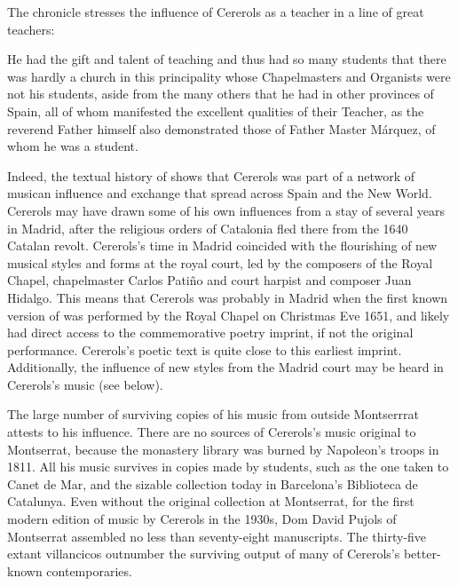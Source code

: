 The chronicle stresses the influence of Cererols as a teacher in a line of great
teachers:
\begin{quoting}
    He had the gift and talent of teaching and thus had so many students that
    there was hardly a church in this principality  whose
    Chapelmasters and Organists were not his students, aside from the many
    others that he had in other provinces of Spain, all of whom manifested the
    excellent qualities of their Teacher, as the reverend Father himself also
    demonstrated those of Father Master Márquez, of whom he  was a
    student.%
    \Autocite[7, note 2]{Estrada:CererolsBio}
\end{quoting}
Indeed, the textual history of  shows that Cererols
was part of a network of musican influence and exchange that spread across Spain
and the New World. 
Cererols may have drawn some of his own influences from a stay of several years
in Madrid, after the religious orders of Catalonia fled there from the 1640
Catalan revolt.
Cererols's time in Madrid coincided with the flourishing of new musical styles
and forms at the royal court, led by the composers of the Royal Chapel,
chapelmaster Carlos Patiño and court harpist and composer Juan Hidalgo.%
    \Autocites
    {Stein:Songs}
    {Rodriguez:Villancico}
This means that Cererols was probably in Madrid when the first known version of
 was performed by the Royal Chapel on Christmas Eve
1651, and likely had direct access to the commemorative poetry imprint, if not
the original performance.
Cererols's poetic text is quite close to this earliest imprint.
Additionally, the influence of new styles from the Madrid court may be heard in
Cererols's music (see below).

The large number of surviving copies of his music from outside Montserrrat
attests to his influence.
There are no sources of Cererols's music original to Montserrat, because the
monastery library was burned by Napoleon's troops in 1811.
All his music survives in copies made by students, such as the one taken to
Canet de Mar, and the sizable collection today in Barcelona's Biblioteca de
Catalunya.
Even without the original collection at Montserrat, for the first modern edition
of music by Cererols in the 1930s, Dom David Pujols of Montserrat assembled no
less than seventy-eight manuscripts.%
    \Autocite{Cererols:MEM-VC}
The thirty-five extant villancicos outnumber the surviving output of many of
Cererols's better-known contemporaries.


